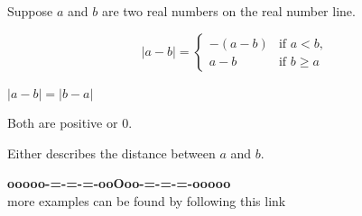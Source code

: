 \documentclass{ximera}
\begin{document}
Suppose $a$ and $b$ are two real numbers on the real number line.





\[
|a-b| = 
\begin{cases}
  -(a-b) & \text{if $a<b$,}  \\
  a-b & \text{if $b\ge a$}
\end{cases}
\]



$|a-b| = |b-a|$

Both are positive or $0$.

Either describes the distance between $a$ and $b$.






















\begin{onlineOnly}
\begin{center}
\textbf{\textcolor{green!50!black}{ooooo-=-=-=-ooOoo-=-=-=-ooooo}} \\

more examples can be found by following this link\\ 

\end{center}
\end{onlineOnly}
\end{document}

